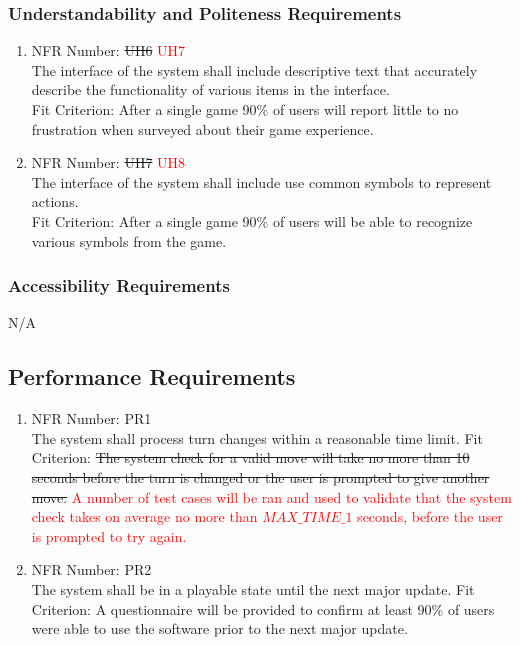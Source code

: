 \documentclass[12pt, titlepage]{article}
\begin{document}
\subsubsection{Understandability and Politeness Requirements}
\begin{enumerate}
    \item NFR Number: \sout{UH6} \textcolor{red}{UH7}\\ %
    The interface of the system shall include descriptive text that accurately describe the functionality of various items in the interface.\\
    Fit Criterion: After a single game 90\% of users will report little to no frustration when surveyed about their game experience.
     \item NFR Number: \sout{UH7} \textcolor{red}{UH8}\\ %
    The interface of the system shall include use common symbols to represent actions.\\
    Fit Criterion: After a single game 90\% of users will be able to recognize various symbols from the game.
\end{enumerate}
\subsubsection{Accessibility Requirements}
N/A

\subsection{Performance Requirements}
\begin{enumerate}
    \item NFR Number: PR1\\%
    The system shall process turn changes within a reasonable time limit.
    Fit Criterion: \sout{The system check for a valid move will take no more than 10 seconds before the turn is changed or the user is prompted to give another move.} \textcolor{red}{A number of test cases will be ran and used to validate that the system check takes on average no more than $MAX\_TIME\_1$ seconds, before the user is prompted to try again.}
    \item NFR Number: PR2\\%
    The system shall be in a playable state until the next major update.
    Fit Criterion: A questionnaire will be provided to confirm at least 90\% of users were able to use the software prior to the next major update.
\end{enumerate}
\end{document}
